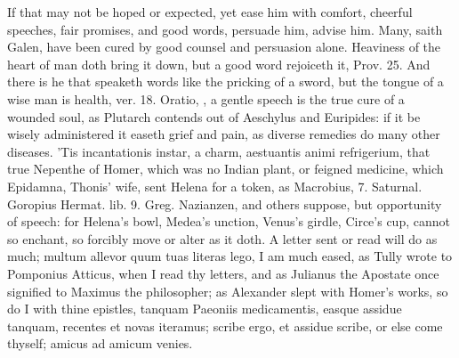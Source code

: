 {If that may not be hoped or expected, yet ease him with comfort,
cheerful speeches, fair promises, and good words, persuade him, advise
him. Many, saith Galen, have been cured by good counsel and
persuasion alone. Heaviness of the heart of man doth bring it down, but
a good word rejoiceth it, Prov.  25. And there is he that speaketh
words like the pricking of a sword, but the tongue of a wise man is
health, ver. 18. Oratio, , a gentle
speech is the true cure of a wounded soul, as Plutarch contends
out of Aeschylus and Euripides: if it be wisely administered it easeth
grief and pain, as diverse remedies do many other diseases. 'Tis
incantationis instar, a charm, aestuantis animi refrigerium, that true
Nepenthe of Homer, which was no Indian plant, or feigned medicine,
which Epidamna, Thonis' wife, sent Helena for a token, as Macrobius, 7.
Saturnal. Goropius Hermat. lib. 9. Greg. Nazianzen, and others suppose,
but opportunity of speech: for Helena's bowl, Medea's unction, Venus's
girdle, Circe's cup, cannot so enchant, so forcibly move or alter as it
doth. A letter sent or read will do as much; multum allevor quum tuas
literas lego, I am much eased, as Tully wrote to Pomponius
Atticus, when I read thy letters, and as Julianus the Apostate once
signified to Maximus the philosopher; as Alexander slept with Homer's
works, so do I with thine epistles, tanquam Paeoniis medicamentis,
easque assidue tanquam, recentes et novas iteramus; scribe ergo, et
assidue scribe, or else come thyself; amicus ad amicum venies.

}
